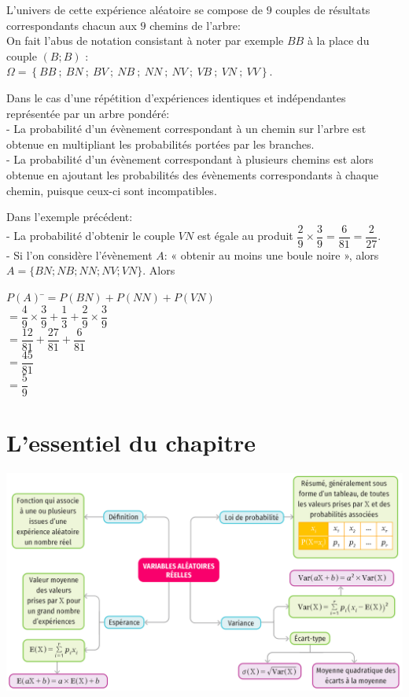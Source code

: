 \documentclass[a4paper,11pt,cours]{nsi} %
\begin{document}
	
L'univers de cette expérience aléatoire se compose de $9$ couples de résultats correspondants chacun aux $9$ chemins de l'arbre:\\
On fait l'abus de notation consistant à noter par exemple $BB$ à la place du couple $(B;B)$ :\\
$\Omega=\left\{BB\ ;\ BN\ ;\ BV\ ;\ NB\ ; \ NN \ ; \ NV \ ; \ VB \ ; \ VN \ ; \ VV\right\}$.\\
\begin{propriete}
	Dans le cas d'une répétition d'expériences identiques et indépendantes représentée par un arbre pondéré:\\
	- La probabilité d'un évènement correspondant à un chemin sur l'arbre est obtenue en multipliant les probabilités portées par les branches.\\
	- La probabilité d'un évènement correspondant à plusieurs chemins est alors obtenue en ajoutant les probabilités des évènements 
	correspondants à chaque chemin, puisque ceux-ci sont incompatibles.
\end{propriete}

\begin{exemple}[]
	Dans l'exemple précédent:\\
	- La probabilité d'obtenir le couple $VN$ est égale au produit $\dfrac{2}{9}\times\dfrac{3}{9}=\dfrac{6}{81}=\dfrac{2}{27}$.\\
	
	- Si l'on considère l'évènement $A$: « obtenir au moins une boule noire », alors $A=\{BN;NB;NN;NV;VN\}$. Alors 
	\begin{tabbing}
		$P(A)$	\=$=P(BN)+P(NN)+P(VN)$\\[0.5em]
		\>$=\dfrac{4}{9}\times\dfrac{3}{9}+\dfrac{1}{3}+\dfrac{2}{9}\times\dfrac{3}{9}$\\[0.5em]
		\>$=\dfrac{12}{81}+\dfrac{27}{81}+\dfrac{6}{81}$\\[0.5em]
		\>$=\dfrac{45}{81}$\\[0.5em]	
		\>$=\dfrac{5}{9}$
	\end{tabbing}
\end{exemple}

\section{L'essentiel du chapitre}
\begin{aretenir}
	\begin{center}
		\includegraphics[width=16cm]{aretenir}
	\end{center}
\end{aretenir}
\end{document}
